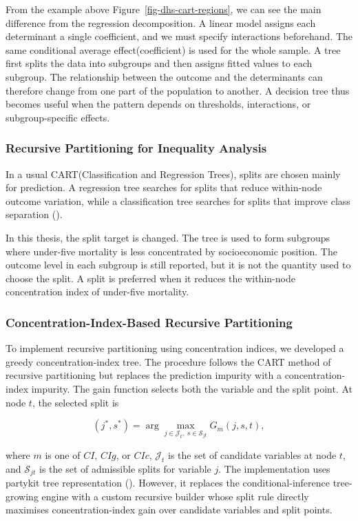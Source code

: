 \documentclass[
  11pt,
  a4paper,
]{article}
\begin{document}
From the example above Figure~\ref{fig-dhs-cart-regions}, we can see the
main difference from the regression decomposition. A linear model
assigns each determinant a single coefficient, and we must specify
interactions beforehand. The same conditional average
effect(coefficient) is used for the whole sample. A tree first splits
the data into subgroups and then assigns fitted values to each subgroup.
The relationship between the outcome and the determinants can therefore
change from one part of the population to another. A decision tree thus
becomes useful when the pattern depends on thresholds, interactions, or
subgroup-specific effects.

\subsubsection{Recursive Partitioning for Inequality
Analysis}\label{sec-recursive-partitioning-inequality}

In a usual CART(Classification and Regression Trees), splits are chosen
mainly for prediction. A regression tree searches for splits that reduce
within-node outcome variation, while a classification tree searches for
splits that improve class separation
().

In this thesis, the split target is changed. The tree is used to form
subgroups where under-five mortality is less concentrated by
socioeconomic position. The outcome level in each subgroup is still
reported, but it is not the quantity used to choose the split. A split
is preferred when it reduces the within-node concentration index of
under-five mortality.

\subsubsection{Concentration-Index-Based Recursive
Partitioning}\label{sec-ci-recursive-partitioning}

To implement recursive partitioning using concentration indices, we
developed a greedy concentration-index tree. The procedure follows the
CART method of recursive partitioning but replaces the prediction
impurity with a concentration-index impurity. The gain function selects
both the variable and the split point. At node \(t\), the selected split
is

\[
(j^*, s^*)
=
\arg\max_{j \in \mathcal{J}_t,\; s \in \mathcal{S}_{jt}}
G_m(j, s, t),
\]

where \(m\) is one of \(CI\), \(CIg\), or \(CIc\), \(\mathcal{J}_t\) is
the set of candidate variables at node \(t\), and \(\mathcal{S}_{jt}\)
is the set of admissible splits for variable \(j\). The implementation
uses partykit tree representation
().
However, it replaces the conditional-inference tree-growing engine with
a custom recursive builder whose split rule directly maximises
concentration-index gain over candidate variables and split points.
\end{document}
